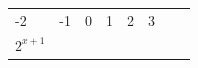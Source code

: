 {{\begin{center}
\begin{tabular}[t]{|l|l|l|l|l|l|l|l|}
    
        -2 &
    
    
        -1 &
    
    
        0 &
    
    
        1 &
    
    
        2 &
    
    
        3%
     \tabularnewline\cline{1-1}\cline{2-2}\cline{3-3}\cline{4-4}\cline{5-5}\cline{6-6}\cline{7-7}\cline{8-8}
    
    
        
                \begin{math}{2}^{x+1}\end{math}
               &
    
    
         &
    

\end{tabular}
\end{center}}}
